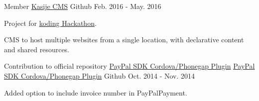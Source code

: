 \begin{cventries}
  \cventry
    {Member} %
    {\href{https://github.com/touwolf/kasije}{Kasije CMS}} %
    {\faGithubSquare\acvHeaderIconSep Github} %
    {Feb. 2016 - May. 2016} %
    {
      \begin{cvitems} %
        \item {Project for \href{https://www.koding.com/Hackathon}{koding Hackathon}.}
        \item {CMS to host multiple websites from a single location, with declarative content and shared resources.}
      \end{cvitems}
    }

  \cventry
    {Contribution to official repository \href{https://github.com/paypal/PayPal-Cordova-Plugin}{PayPal SDK Cordova/Phonegap Plugin}} %
    {\faPaypal \hphantom{-} \href{https://github.com/miche-atucha/PayPal-Cordova-Plugin}{PayPal SDK Cordova/Phonegap Plugin}} %
    {\faGithubSquare\acvHeaderIconSep Github} %
    {Oct. 2014 - Nov. 2014} %
    {
      \begin{cvitems} %
        \item {Added option to include invoice number in PayPalPayment.}
      \end{cvitems}
    }

\end{cventries}
